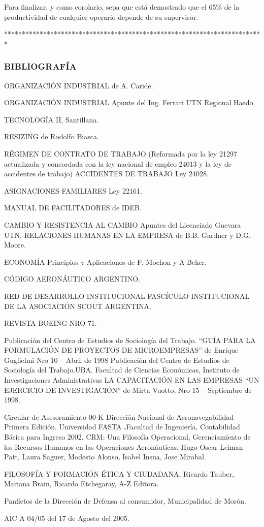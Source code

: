 Para finalizar, y como corolario, sepa que está demostrado que el 65\% de la productividad de cualquier operario depende de su supervisor.

*************************************************************************



\subsubsection*{BIBLIOGRAFÍA}
ORGANIZACIÓN INDUSTRIAL de A. Caride.

ORGANIZACIÓN INDUSTRIAL Apunte del Ing. Ferrari UTN Regional Haedo.

TECNOLOGÍA II, Santillana.

RESIZING de Rodolfo Biasca.

RÉGIMEN DE CONTRATO DE TRABAJO (Reformada por la ley 21297 actualizada y concordada con la ley nacional de empleo 24013 y la ley de accidentes de trabajo) ACCIDENTES DE TRABAJO Ley 24028.

ASIGNACIONES FAMILIARES Ley 22161.

MANUAL DE FACILITADORES de IDEB.

CAMBIO Y RESISTENCIA AL CAMBIO Apuntes del Licenciado Guevara UTN. RELACIONES HUMANAS EN LA EMPRESA de B.B. Gardner y D.G. Moore.

ECONOMÍA Principios y Aplicaciones de F. Mochon y A Beker.

CÓDIGO AERONÁUTICO ARGENTINO.

RED DE DESARROLLO INSTITUCIONAL FASCÍCULO INSTITUCIONAL DE LA ASOCIACIÓN SCOUT ARGENTINA.

REVISTA BOEING NRO 71.

Publicación del Centro de Estudios de Sociología del Trabajo. “GUÍA PARA LA FORMULACIÓN DE PROYECTOS DE MICROEMPRESAS” de Enrique Guglielmi Nro 10 – Abril de 1998 Publicación del Centro de Estudios de Sociología del Trabajo.UBA. Facultad de Ciencias Económicas, Instituto de Investigaciones Administrativas LA CAPACITACIÓN EN LAS EMPRESAS “UN EJERCICIO DE INVESTIGACIÓN” de Mirta Vuotto, Nro 15 – Septiembre de 1998.

Circular de Asesoramiento 00-K Dirección Nacional de Aeronavegabilidad Primera Edición. Universidad FASTA \textbf{.}Facultad de Ingeniería, Contabilidad Básica para Ingreso 2002. CRM: Una Filosofía Operacional, Gerenciamiento de los Recursos Humanos en las Operaciones Aeronáuticas, Hugo Oscar Leiman Patt, Laura Saguer, Modesto Alonso, Isabel Insua, Jose Mirabal.

FILOSOFÍA Y FORMACIÓN ÉTICA Y CIUDADANA, Ricardo Tauber, Mariana Brain, Ricardo Etchegaray, A-Z Editora.

Panfletos de la Dirección de Defensa al consumidor, Municipalidad de Morón.

AIC A 04/05 del 17 de Agosto del 2005.

